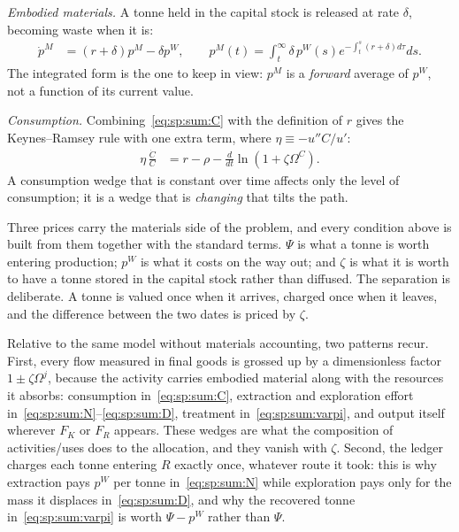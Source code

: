 \emph{Embodied materials.} A tonne held in the capital stock is released at rate $\delta$, becoming waste when it is:
\begin{align}
\dot p^M &= \left(r+\delta\right)p^M-\delta p^W,
\qquad
p^M\left(t\right)=\int_t^\infty\delta\,p^W\!\left(s\right)e^{-\int_t^s\left(r+\delta\right)d\tau}ds .
\label{eq:sp:sum:M}
\end{align}
The integrated form is the one to keep in view: $p^M$ is a \emph{forward} average of $p^W$, not a function of its current value.

\emph{Consumption.} Combining~\eqref{eq:sp:sum:C} with the definition of $r$ gives the Keynes--Ramsey rule with one extra term, where $\eta\equiv-u''C/u'$:
\begin{align}
\eta\,\frac{\dot C}{C} &= r-\rho-\frac{d}{dt}\ln\left(1+\zeta\Omega^C\right).
\label{eq:sp:sum:Cgrowth}
\end{align}
A consumption wedge that is constant over time affects only the level of consumption; it is a wedge that is \emph{changing} that tilts the path.



 Three prices carry the materials side of the problem, and every condition above is built from them together with the standard terms. $\Psi$ is what a tonne is worth entering production; $p^W$ is what it costs on the way out; and $\zeta$ is what it is worth to have a tonne stored in the capital stock rather than diffused. The separation is deliberate. A tonne is valued once when it arrives, charged once when it leaves, and the difference between the two dates is priced by $\zeta$.

Relative to the same model without materials accounting, two patterns recur. First, every flow measured in final goods is grossed up by a dimensionless factor $1\pm\zeta\Omega^j$, because the activity carries embodied material along with the resources it absorbs: consumption in~\eqref{eq:sp:sum:C}, extraction and exploration effort in~\eqref{eq:sp:sum:N}--\eqref{eq:sp:sum:D}, treatment in~\eqref{eq:sp:sum:varpi}, and output itself wherever $F_K$ or $F_R$ appears. These wedges are what the composition of activities/uses does to the allocation, and they vanish with $\zeta$. Second, the ledger charges each tonne entering $R$ exactly once, whatever route it took: this is why extraction pays $p^W$ per tonne in~\eqref{eq:sp:sum:N} while exploration pays only for the mass it displaces in~\eqref{eq:sp:sum:D}, and why the recovered tonne in~\eqref{eq:sp:sum:varpi} is worth $\Psi-p^W$ rather than $\Psi$.


